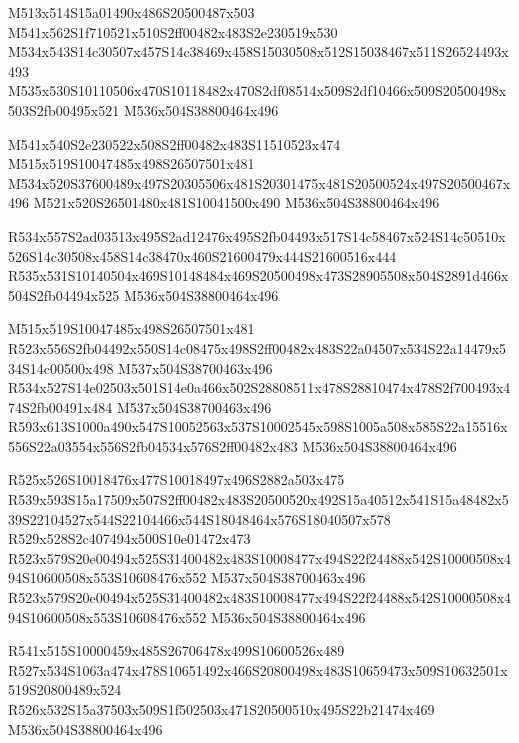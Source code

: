 \documentclass{article}
\begin{document}
\begin{multicols}{5}
\begin{center}
M513x514S15a01490x486S20500487x503 %
M541x562S1f710521x510S2ff00482x483S2e230519x530 %
M534x543S14c30507x457S14c38469x458S15030508x512S15038467x511S26524493x493 %
M535x530S10110506x470S10118482x470S2df08514x509S2df10466x509S20500498x503S2fb00495x521 %
M536x504S38800464x496 %

M541x540S2e230522x508S2ff00482x483S11510523x474 %
M515x519S10047485x498S26507501x481 %
M534x520S37600489x497S20305506x481S20301475x481S20500524x497S20500467x496 %
M521x520S26501480x481S10041500x490 %
M536x504S38800464x496 %

R534x557S2ad03513x495S2ad12476x495S2fb04493x517S14c58467x524S14c50510x526S14c30508x458S14c38470x460S21600479x444S21600516x444 %
R535x531S10140504x469S10148484x469S20500498x473S28905508x504S2891d466x504S2fb04494x525 %
M536x504S38800464x496 %

M515x519S10047485x498S26507501x481 %
R523x556S2fb04492x550S14c08475x498S2ff00482x483S22a04507x534S22a14479x534S14c00500x498 %
M537x504S38700463x496 %
R534x527S14e02503x501S14e0a466x502S28808511x478S28810474x478S2f700493x474S2fb00491x484 %
M537x504S38700463x496 %
R593x613S1000a490x547S10052563x537S10002545x598S1005a508x585S22a15516x556S22a03554x556S2fb04534x576S2ff00482x483 %
M536x504S38800464x496 %

R525x526S10018476x477S10018497x496S2882a503x475 %
R539x593S15a17509x507S2ff00482x483S20500520x492S15a40512x541S15a48482x539S22104527x544S22104466x544S18048464x576S18040507x578 %
R529x528S2c407494x500S10e01472x473 %
R523x579S20e00494x525S31400482x483S10008477x494S22f24488x542S10000508x494S10600508x553S10608476x552 %
M537x504S38700463x496 %
R523x579S20e00494x525S31400482x483S10008477x494S22f24488x542S10000508x494S10600508x553S10608476x552 %
M536x504S38800464x496 %

R541x515S10000459x485S26706478x499S10600526x489 %
R527x534S1063a474x478S10651492x466S20800498x483S10659473x509S10632501x519S20800489x524 %
R526x532S15a37503x509S1f502503x471S20500510x495S22b21474x469 %
M536x504S38800464x496 %


\end{center}
\end{multicols}
\end{document}
